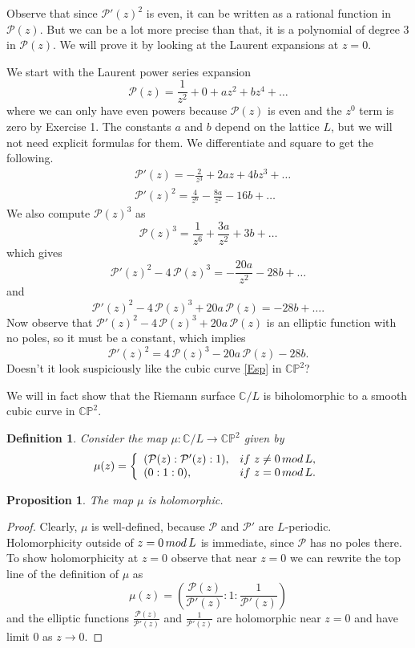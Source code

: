 \documentclass[11pt]{article}
\numberwithin{equation}{section}
\numberwithin{footnote}{section}
\newtheorem{prop}[thm]{Proposition}
\newtheorem{defn}[thm]{Definition}
\renewcommand{\P}{{\mathbb P}}
\newcommand{\C}{{\mathbb C}}
\begin{document}
\smallskip
Observe that since $\mathcal P'(z)^2$ is even, it can be written as a rational function in $\mathcal P(z)$. But we can be a lot more precise than that, it is a polynomial of degree $3$ in $\mathcal P(z)$. We will prove it by looking at the Laurent expansions at $z=0$.

\smallskip
We start with the Laurent power series expansion 
$$
\mathcal P(z) = \frac 1{z^2}+ 0 + a z^2 + bz^4 + \ldots
$$
where we can only have even powers because $\mathcal P(z)$ is even and the $z^0$ term is zero by Exercise 1. The constants $a$ and $b$ depend on the lattice $L$, but we will not need explicit formulas for them. We differentiate and square to get the following.
\begin{align*}
&\mathcal P'(z) = -\frac 2{z^3} + 2a z + 4bz^3 + \ldots
\\
&\mathcal P'(z)^2 = \frac 4{z^6} - \frac {8a}{z^2} - 16b + \ldots
\end{align*}
We also compute $\mathcal P(z)^3$ as
$$
\mathcal P(z)^3 = \frac 1{z^6} + \frac {3a}{z^2} + 3b + \ldots
$$
which gives
$$
\mathcal P'(z)^2-4\,\mathcal P(z)^3 = -\frac {20a}{z^2} - 28 b + \ldots
$$
and 
$$
\mathcal P'(z)^2-4\,\mathcal P(z)^3 + 20a\,\mathcal P(z) = -28b + \ldots.
$$
Now observe that $\mathcal P'(z)^2-4\,\mathcal P(z)^3 + 20a\,\mathcal P(z)$ is an elliptic function with no poles, so it must be a constant, which implies 
\begin{equation}\label{CLcubic}
\mathcal P'(z)^2 =4\,\mathcal P(z)^3 - 20a\,\mathcal P(z) - 28b.
\end{equation}
\smallskip
Doesn't it look suspiciously like the cubic curve \eqref{Esp} in $\C\P^2$? 

\smallskip
We will in fact show that the Riemann surface $\C/L$ is biholomorphic to a smooth cubic curve in $\C\P^2$.
\begin{defn}
Consider the map $\mu:\C/L\to \C\P^2$ given by
$$
\mu(z) = \left\{
\begin{array}{ll}
(\mathcal P(z):\mathcal P'(z):1),&{\rm if~} z\neq 0\,{\rm mod}\,L,\\
(0:1:0),&{\rm if~}z=0\,{\rm mod}\,L.
\end{array}
\right.
$$
\end{defn}

\begin{prop}
The map $\mu$ is holomorphic.
\end{prop}

\begin{proof}
Clearly, $\mu$ is well-defined, because $\mathcal P$ and $\mathcal P'$ are $L$-periodic. Holomorphicity outside of $z=0\,{\rm mod}\, L$ is immediate, since $\mathcal P$ has no poles there. To show holomorphicity at $z=0$ observe that near $z=0$ we can rewrite the top line of the definition of $\mu$ as 
\begin{equation}\label{near0}
\mu(z) = \left(\frac{\mathcal P(z)}{\mathcal P'(z)}:1:\frac 1{\mathcal P'(z)}\right)
\end{equation}
and the elliptic functions  $\frac{\mathcal P(z)}{\mathcal P'(z)}$ and $\frac 1{\mathcal P'(z)}$ are holomorphic near $z=0$ and have limit $0$ as $z\to 0$.
\end{proof}
\end{document}
